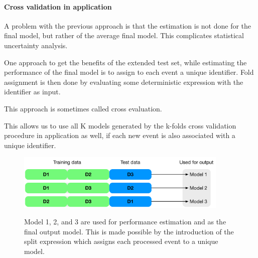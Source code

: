\paragraph{Cross validation in application}
A problem with the previous approach is that the estimation is not done for the final model, but rather of the average final model. This complicates statistical uncertainty analysis.

One approach to get the benefits of the extended test set, while estimating the performance of the final model is to assign to each event a unique identifier. Fold assignment is then done by evaluating some deterministic expression with the identifier as input.

This approach is sometimes called cross evaluation.

This allows us to use all K models generated by the k-folds cross validation procedure in application as well, if each new event is also associated with a unique identifier.




\begin{figure}
\begin{center}
   \includegraphics[width=0.9\textwidth]{plots/cv/cv-workflows-ce}
   \label{fig:workflow1}
   \caption{Model 1, 2, and 3 are used for performance estimation and as the final output model. This is made possible by the introduction of the split expression which assigns each processed event to a unique model.}
\end{center}
\end{figure}











